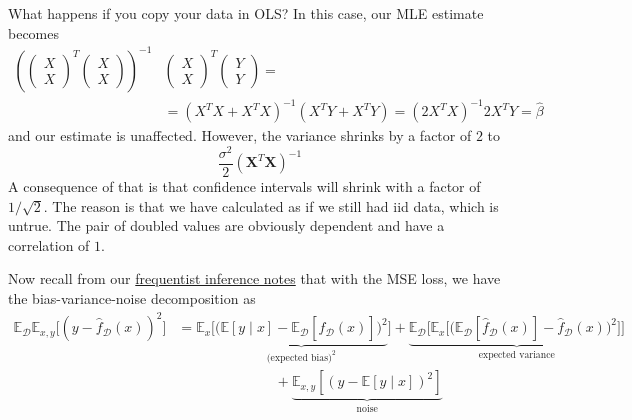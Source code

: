   \begin{example}
    What happens if you copy your data in OLS? In this case, our MLE estimate becomes 
    \begin{align*}
        \left(\begin{pmatrix}X \\ X \end{pmatrix}^T \begin{pmatrix} X \\ X \end{pmatrix} \right )^{-1} & \begin{pmatrix} X \\ X  \end{pmatrix}^T \begin{pmatrix} Y \\ Y  \end{pmatrix}  =\\
    & = (X^T X + X^T X)^{-1} (X^T Y + X^T Y ) = (2 X^T X)^{-1} 2 X^T Y = \hat{\beta}
    \end{align*}
    and our estimate is unaffected. However, the variance shrinks by a factor of $2$ to 
    \begin{equation}
      \frac{\sigma^2}{2} (\mathbf{X}^T \mathbf{X})^{-1}
    \end{equation}
    A consequence of that is that confidence intervals will shrink with a factor of $1/\sqrt{2}$. The reason is that we have calculated as if we still had iid data, which is untrue. The pair of doubled values are obviously dependent and have a correlation of $1$. 
  \end{example}

  Now recall from our \hyperref[fi-bias_variance_mse]{frequentist inference notes} that with the MSE loss, we have the bias-variance-noise decomposition as 
  \begin{align}
    \mathbb{E}_{\mathcal{D}} \mathbb{E}_{x, y} \big[ (y - \hat{f}_{\mathcal{D}}(x))^2 \big] 
    & = \mathbb{E}_{x} \big[ \underbrace{ \big( \mathbb{E}[y \mid x] - \mathbb{E}_{\mathcal{D}} [\hat{f}_\mathcal{D} (x)] \big)^2}_{\text{(expected bias)}^2} \big] + \underbrace{ \mathbb{E}_\mathcal{D} \big[ \mathbb{E}_{x} \big[ \big( \mathbb{E}_\mathcal{D} [\hat{f}_\mathcal{D} (x)] - \hat{f}_\mathcal{D} (x) \big)^2 \big] \big]}_{\text{expected variance}} \\ 
    & \;\;\;\;\;\;\;\;\;\;\;\;\;\;\;\;\;\;\;\;\;\;\;\;\; + \underbrace{\mathbb{E}_{x, y} [(y - \mathbb{E}[y \mid x])^2]}_{\text{noise}}
  \end{align}

